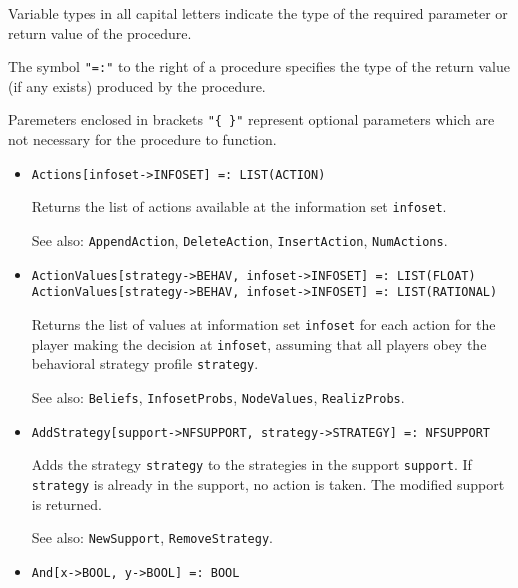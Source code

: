 Variable types in all capital letters indicate the type of the
required parameter or return value of the procedure.

The symbol {\tt "=:"} to the right of a procedure specifies the type
of the return value (if any exists) produced by the procedure.

Paremeters enclosed in brackets {\tt "\{ \}"} represent optional
parameters which are not necessary for the procedure to function.

\begin{itemize}


\item
\protect \large \begin{verbatim} 
Actions[infoset->INFOSET] =: LIST(ACTION)
\end{verbatim}\normalsize

\bd
Returns the list of actions available at the information set
\verb+infoset+.
\item
[See also:] {\tt AppendAction}, {\tt DeleteAction}, {\tt InsertAction},
{\tt NumActions}.
\ed

\item
\protect \large \begin{verbatim}
ActionValues[strategy->BEHAV, infoset->INFOSET] =: LIST(FLOAT)
ActionValues[strategy->BEHAV, infoset->INFOSET] =: LIST(RATIONAL)
\end{verbatim}\normalsize

\bd
Returns the list of values at information set \verb+infoset+ for each
action for the player making the decision at \verb+infoset+, assuming that
all players obey the behavioral strategy profile \verb+strategy+.
\item
[See also:] {\tt Beliefs}, {\tt InfosetProbs}, {\tt NodeValues},
{\tt RealizProbs}.
\ed

\item
\protect \large \begin{verbatim}
AddStrategy[support->NFSUPPORT, strategy->STRATEGY] =: NFSUPPORT
\end{verbatim}\normalsize

\bd
Adds the strategy \verb+strategy+ to the
strategies in the support \verb+support+.  If \verb+strategy+ is already in the
support, no action is taken.  The modified support is returned.
\item
[See also:] {\tt NewSupport}, {\tt RemoveStrategy}.
\ed

\item 
\protect \large \begin{verbatim}
And[x->BOOL, y->BOOL] =: BOOL
\end{verbatim} \normalsize


\end{itemize}
